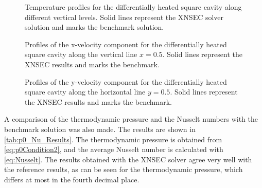 \begin{figure}[h]
	\centering
	\pgfplotsset{width=0.22\textwidth, compat=1.3} 
	\caption[Temperature profiles for the differentially heated square cavity along different vertical levels.]{Temperature profiles for the differentially heated square cavity along different vertical levels. Solid lines represent the XNSEC solver solution and marks the benchmark solution.}
	\label{fig:TempProfile}
\end{figure}
\begin{figure}[h]
	\centering
	\pgfplotsset{width=0.22\textwidth, compat=1.3}
	\caption[Profiles of the x-velocity component for the differentially heated square cavity along the vertical line $x=0.5$.]{Profiles of the x-velocity component for the differentially heated square cavity along the vertical line $x=0.5$. Solid lines represent the XNSEC results and marks the benchmark.}
	\label{fig:VelocityXProfile}
\end{figure}%
%
\begin{figure}[h]
	\centering
	\pgfplotsset{width=0.22\textwidth, compat=1.3}
	\caption[Profiles of the y-velocity component for the differentially heated square cavity along the horizontal line $y=0.5$.]{Profiles of the y-velocity component for the differentially heated square cavity along the horizontal line $y=0.5$. Solid lines represent the XNSEC results and marks the benchmark.}
	\label{fig:VelocityYProfile}
\end{figure}
\FloatBarrier
A comparison of the thermodynamic pressure and the Nusselt numbers with the benchmark solution was also made. The results are shown in \cref{tab:p0_Nu_Results}.  The thermodynamic pressure is obtained from \cref{eq:p0Condition2}, and the average Nusselt number is calculated with \cref{eq:Nusselt}. The results obtained with the XNSEC solver agree very well with the reference results, as can be seen for the thermodynamic pressure, which differs at most in the fourth decimal place. 

